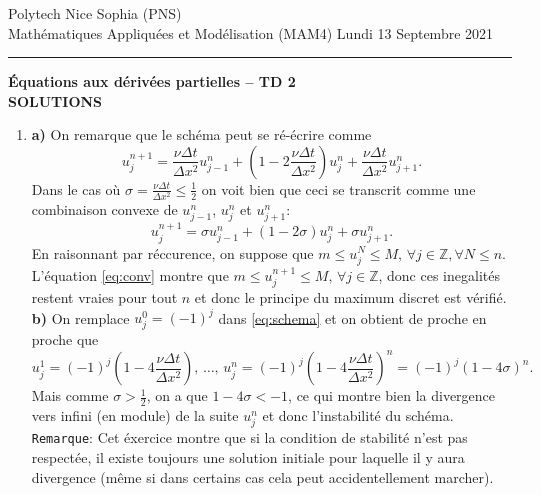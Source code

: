 \documentclass[12pt,a4paper]{article}
\begin{document}
 \hfill Polytech Nice Sophia (PNS)\\
\noindent Math\'ematiques Appliqu\'ees et Mod\'elisation (MAM4) \hfill Lundi 13 Septembre 2021 \\

\hrule

\bigskip
\bigskip

\begin{center}{\bf \'Equations aux d\'eriv\'ees partielles --
TD 2\\ SOLUTIONS}\end{center}

\bigskip

\begin{enumerate}
\item {\bf a)} On remarque que le sch\'ema peut se r\'e-\'ecrire comme
\begin{equation}\label{eq:schema}
u_j^{n+1} = \frac{\nu\Delta t}{\Delta x^2}u^n_{j-1} +
\left(1-2\frac{\nu\Delta t}{\Delta x^2}\right)u_j^n + \frac{\nu\Delta t}{\Delta x^2}u^n_{j+1}.
\end{equation}
Dans le cas o\`u $\sigma = \frac{\nu\Delta t}{\Delta x^2} \le
\frac{1}{2}$ on voit bien que ceci se transcrit comme une combinaison
convexe de $u_{j-1}^n$, $u_{j}^n$ et
$u_{j+1}^n$:
\begin{equation}\label{eq:conv}
u_j^{n+1} = \sigma u^n_{j-1} +
\left(1-2\sigma\right)u_j^n + \sigma u^n_{j+1}.
\end{equation}
En raisonnant par r\'eccurence, on suppose que $m\le u_j^N \le
M,\, \forall j\in\mathbb{Z}, \forall N\le n$. L'\'equation
\eqref{eq:conv} montre que $m\le u_j^{n+1} \le
M,\, \forall j\in\mathbb{Z}$, donc ces inegalit\'es restent vraies
pour tout $n$ et donc le principe du maximum discret est v\'erifi\'e.\\
{\bf b)} On remplace $u_j^0=(-1)^j$ dans \eqref{eq:schema} et on
obtient de proche en proche que
\begin{equation}
u_j^1 = (-1)^j\left(1-4\frac{\nu\Delta t}{\Delta
    x^2}\right),\,\hdots,\, u_j^n = (-1)^j\left(1-4\frac{\nu\Delta t}{\Delta
    x^2}\right)^n = (-1)^j\left(1-4\sigma\right)^n.
\end{equation}
Mais comme $\sigma>\frac{1}{2}$, on a que $1-4\sigma<-1$, ce qui
montre bien la divergence vers infini (en module) de la suite $u_j^n$
et donc l'instabilit\'e du sch\'ema.\\
\texttt{Remarque}: Cet \'exercice montre que si la condition de
stabilit\'e n'est pas respect\'ee, il existe toujours une solution
initiale pour laquelle il y aura divergence (m\^eme si dans certains
cas cela peut accidentellement marcher).


\end{enumerate}
\end{document}
